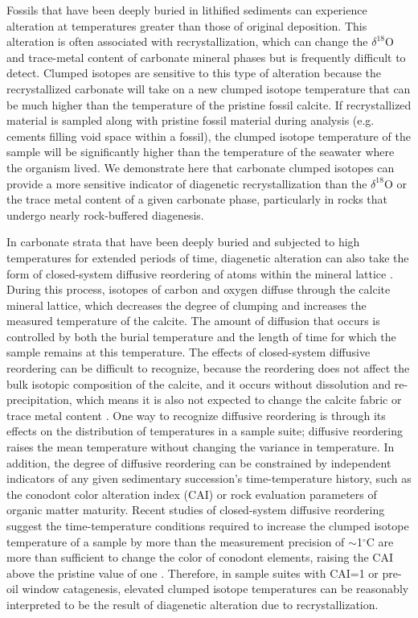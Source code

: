 \documentclass[preprint, authoryear]{elsarticle}
\begin{document}
Fossils that have been deeply buried in lithified sediments can experience alteration at temperatures greater than those of original deposition. This alteration is often associated with recrystallization, which can change the $\delta^{18}$O and trace-metal content of carbonate mineral phases but is frequently difficult to detect. Clumped isotopes are sensitive to this type of alteration because the recrystallized carbonate will take on a new clumped isotope temperature that can be much higher than the temperature of the pristine fossil calcite. If recrystallized material is sampled along with pristine fossil material during analysis (e.g. cements filling void space within a fossil), the clumped isotope temperature of the sample will be significantly higher than the temperature of the seawater where the organism lived. We demonstrate here that carbonate clumped isotopes can provide a more sensitive indicator of diagenetic recrystallization than the $\delta^{18}$O or the trace metal content of a given carbonate phase, particularly in rocks that undergo nearly rock-buffered diagenesis. 

In carbonate strata that have been deeply buried and subjected to high temperatures for extended periods of time, diagenetic alteration can also take the form of closed-system diffusive reordering of atoms within the mineral lattice \citep{Dennis2013, Huntington2011, Quade2013, VanDeVelde2013}. During this process, isotopes of carbon and oxygen diffuse through the calcite mineral lattice, which decreases the degree of clumping and increases the measured temperature of the calcite. The amount of diffusion that occurs is controlled by both the burial temperature and the length of time for which the sample remains at this temperature. The effects of closed-system diffusive reordering can be difficult to recognize, because the reordering does not affect the bulk isotopic composition of the calcite, and it occurs without dissolution and re-precipitation, which means it is also not expected to change the calcite fabric or trace metal content \citep{Eiler2011}. One way to recognize diffusive reordering is through its effects on the distribution of temperatures in a sample suite; diffusive reordering raises the mean temperature without changing the variance in temperature. In addition, the degree of diffusive reordering can be constrained by independent indicators of any given sedimentary succession’s time-temperature history, such as the conodont color alteration index (CAI) or rock evaluation parameters of organic matter maturity. Recent studies of closed-system diffusive reordering suggest the time-temperature conditions required to increase the clumped isotope temperature of a sample by more than the measurement precision of $\sim$1$^{\circ}$C are more than sufficient to change the color of conodont elements, raising the CAI above the pristine value of one \citep{Dennis2010, Epstein1976, Passey2012, Stolper2014}. Therefore, in sample suites with CAI=1 or pre-oil window catagenesis, elevated clumped isotope temperatures can be reasonably interpreted to be the result of diagenetic alteration due to recrystallization. 
\end{document}
